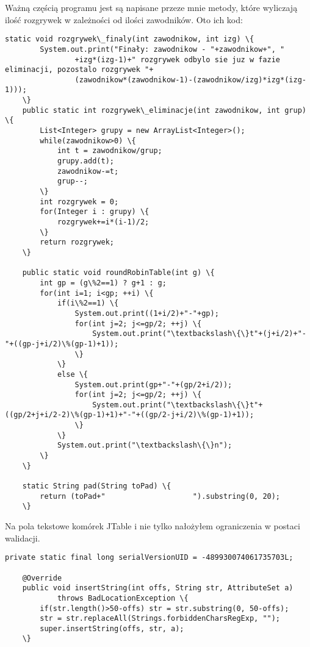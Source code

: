 Ważną częścią programu jest są napisane przeze mnie metody, które wyliczają ilość rozgrywek w zależności od ilości zawodników. Oto ich kod:
\begin{verbatim}
static void rozgrywek\_finaly(int zawodnikow, int izg) \{
		System.out.print("Finały: zawodnikow - "+zawodnikow+", "
				+izg*(izg-1)+" rozgrywek odbylo sie juz w fazie eliminacji, pozostalo rozgrywek "+
				(zawodnikow*(zawodnikow-1)-(zawodnikow/izg)*izg*(izg-1)));
	\}
	public static int rozgrywek\_eliminacje(int zawodnikow, int grup) \{
		List<Integer> grupy = new ArrayList<Integer>();
		while(zawodnikow>0) \{
			int t = zawodnikow/grup;
			grupy.add(t);
			zawodnikow-=t;
			grup--;
		\}
		int rozgrywek = 0;
		for(Integer i : grupy) \{
			rozgrywek+=i*(i-1)/2;
		\}
		return rozgrywek;
	\}
	
	public static void roundRobinTable(int g) \{
		int gp = (g\%2==1) ? g+1 : g;
		for(int i=1; i<gp; ++i) \{
			if(i\%2==1) \{
				System.out.print((1+i/2)+"-"+gp);
				for(int j=2; j<=gp/2; ++j) \{
					System.out.print("\textbackslash\{\}t"+(j+i/2)+"-"+((gp-j+i/2)\%(gp-1)+1));
				\}
			\}
			else \{
				System.out.print(gp+"-"+(gp/2+i/2));
				for(int j=2; j<=gp/2; ++j) \{
					System.out.print("\textbackslash\{\}t"+((gp/2+j+i/2-2)\%(gp-1)+1)+"-"+((gp/2-j+i/2)\%(gp-1)+1));
				\}
			\}
			System.out.print("\textbackslash\{\}n");
		\}
	\}
	
	static String pad(String toPad) \{
		return (toPad+"                    ").substring(0, 20);
	\}
\end{verbatim}

Na pola tekstowe komórek JTable i nie tylko nałożyłem ograniczenia w postaci walidacji.
\begin{verbatim}	
private static final long serialVersionUID = -489930074061735703L;

	@Override
  	public void insertString(int offs, String str, AttributeSet a)
  			throws BadLocationException \{
  		if(str.length()>50-offs) str = str.substring(0, 50-offs);
  		str = str.replaceAll(Strings.forbiddenCharsRegExp, "");
  		super.insertString(offs, str, a);
  	\}
\end{verbatim}

